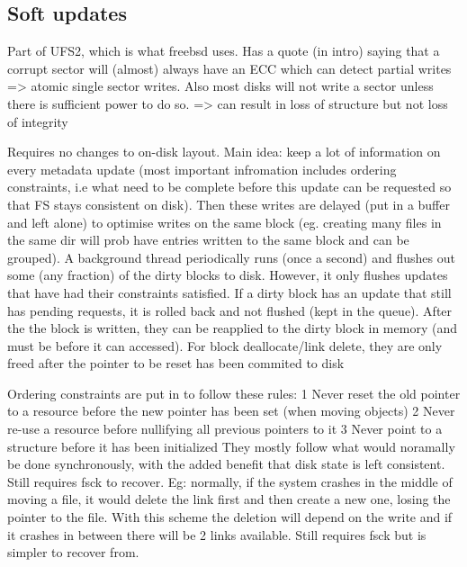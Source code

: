 \documentclass[a4paper]{report}
\begin{document}
    \subsection{Soft updates}

        Part of UFS2, which is what freebsd uses. Has a quote (in intro) saying
        that a corrupt sector will (almost) always have an ECC which can detect
        partial writes => atomic single sector writes. Also most disks will not
        write a sector unless there is sufficient power to do so.
        => can result in loss of structure but not loss of integrity

        Requires no changes to on-disk layout. Main idea: keep a lot of
        information on every metadata update (most important infromation
        includes ordering constraints, i.e what need to be complete before this
        update can be requested so that FS stays consistent on disk). Then
        these writes are delayed (put in a buffer and left alone) to optimise
        writes on the same block (eg. creating many files in the same dir will
        prob have entries written to the same block and can be grouped). A
        background thread periodically runs (once a second) and flushes out
        some (any fraction) of the dirty blocks to disk. However, it only
        flushes updates that have had their constraints satisfied. If a dirty
        block has an update that still has pending requests, it is rolled back
        and not flushed (kept in the queue). After the the block is written,
        they can be reapplied to the dirty block in memory (and must be before
        it can accessed). For block deallocate/link delete, they are only freed
        after the pointer to be reset has been commited to disk

        Ordering constraints are put in to follow these rules:
          1 Never reset the old pointer to a resource before the new pointer has
            been set (when moving objects)
          2 Never re-use a resource before nullifying all previous pointers to
            it
          3 Never point to a structure before it has been initialized
        They mostly follow what would noramally be done synchronously, with the
        added benefit that disk state is left consistent. Still requires fsck
        to recover. Eg: normally, if the system crashes in the middle of moving
        a file, it would delete the link first and then create a new one,
        losing the pointer to the file. With this scheme the deletion will
        depend on the write and if it crashes in between there will be 2 links
        available. Still requires fsck but is simpler to recover from.
\end{document}
